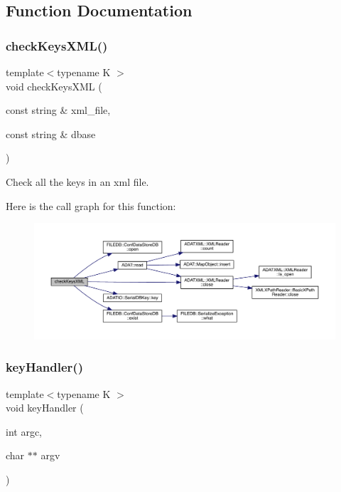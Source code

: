 \subsection{Function Documentation}
\mbox{\label{adat-devel_2main_2dbutil_2dbkeys_8cc_a9c4b0a95ff975fd696e640d75b7963cf}} 
\subsubsection{\texorpdfstring{checkKeysXML()}{checkKeysXML()}}
{\footnotesize\ttfamily template$<$typename K $>$ \\
void check\+Keys\+X\+ML (\begin{DoxyParamCaption}\item[{const string \&}]{xml\+\_\+file,  }\item[{const string \&}]{dbase }\end{DoxyParamCaption})}



Check all the keys in an xml file. 

Here is the call graph for this function\+:
\nopagebreak
\begin{figure}[H]
\begin{center}
\leavevmode
\includegraphics[width=350pt]{d7/d1d/adat-devel_2main_2dbutil_2dbkeys_8cc_a9c4b0a95ff975fd696e640d75b7963cf_cgraph}
\end{center}
\end{figure}
\mbox{\label{adat-devel_2main_2dbutil_2dbkeys_8cc_a55a23fb2c13bc6ba3c5942ed08294e75}} 
\subsubsection{\texorpdfstring{keyHandler()}{keyHandler()}}
{\footnotesize\ttfamily template$<$typename K $>$ \\
void key\+Handler (\begin{DoxyParamCaption}\item[{int}]{argc,  }\item[{char $\ast$$\ast$}]{argv }\end{DoxyParamCaption})}



